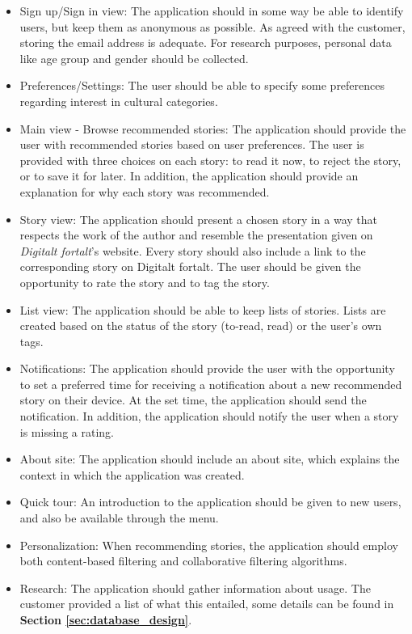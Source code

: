 \begin{itemize}
	\item Sign up/Sign in view: The application should in some way be able to identify users, but keep them as anonymous as possible. As agreed with the customer, storing the email address is adequate. For research purposes, personal data like age group and gender should be collected.
	
	\item Preferences/Settings: The user should be able to specify some preferences regarding interest in cultural categories.
	
	\item Main view - Browse recommended stories: The application should provide the user with recommended stories based on user preferences. The user is provided with three choices on each story: to read it now, to reject the story, or to save it for later. In addition, the application should provide an explanation for why each story was recommended.
	
	\item Story view: The application should present a chosen story in a way that respects the work of the author and resemble the presentation given on \textit{Digitalt fortalt}'s website. Every story should also include a link to the corresponding story on Digitalt fortalt. The user should be given the opportunity to rate the story and to tag the story. 
	
	\item List view: The application should be able to keep lists of stories. Lists are created based on the status of the story (to-read, read) or the user's own tags.
	
	\item Notifications: The application should provide the user with the opportunity to set a preferred time for receiving a notification about a new recommended story on their device. At the set time, the application should send the notification. In addition, the application should notify the user when a story is missing a rating.
	
	\item About site: The application should include an about site, which explains the context in which the application was created.
	
	\item Quick tour: An introduction to the application should be given to new users, and also be available through the menu.  
	
	\item Personalization: When recommending stories, the application should employ both content-based filtering and collaborative filtering algorithms.
	
	\item Research: The application should gather information about usage. The customer provided a list of what this entailed, some details can be found in \textbf{Section \ref{sec:database_design}}.
\end{itemize}


